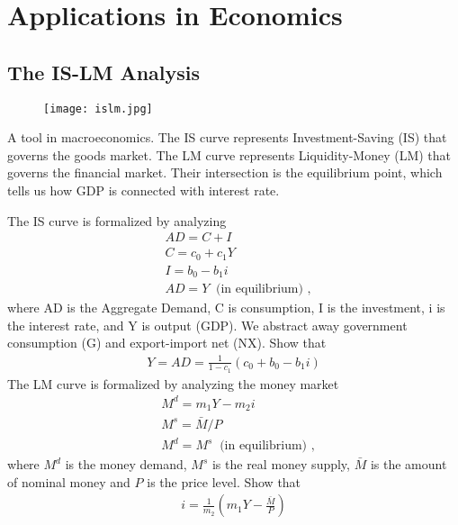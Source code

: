 \documentclass[10pt,a4paper]{book}
\theoremstyle{definition}\newtheorem{definition}{Definition}
\theoremstyle{definition}\newtheorem{fact}{Fact}
\theoremstyle{definition}\newtheorem{ex}{Ex.}
\theoremstyle{definition}\newtheorem{project}{Project}
\theoremstyle{definition}\newtheorem{problem}{Problem}
\theoremstyle{definition}\newtheorem{example}{Example}
\numberwithin{theorem}{chapter}
\numberwithin{corollary}{chapter}
\numberwithin{assumption}{chapter}
\numberwithin{definition}{chapter}
\numberwithin{prop}{chapter}
\numberwithin{notation}{chapter}
\numberwithin{problem}{chapter}
\numberwithin{example}{chapter}
\numberwithin{fact}{chapter}
\numberwithin{ex}{chapter}
\begin{document}
	\chapter{Applications in Economics}
	
	\section{The IS-LM Analysis}
	
	\begin{figure}[ht]
		\centering
		\texttt{[image: islm.jpg]}
	\end{figure}
	
	A tool in macroeconomics. The IS curve represents Investment-Saving (IS) that governs the goods market. The LM curve represents Liquidity-Money (LM) that governs the financial market. Their intersection is the equilibrium point, which tells us how GDP is connected with interest rate.
	
	The IS curve is formalized by analyzing
	\begin{align*}
		& AD = C + I                           \\
		& C = c_0 + c_1 Y                      \\
		& I = b_0 - b_1 i                      \\
		& AD = Y \  \text{ (in equilibrium) }, 
	\end{align*}
	where AD is the Aggregate Demand, C is consumption, I is the investment, i is the interest rate, and Y is output (GDP). We abstract away government consumption (G) and export-import net (NX). Show that
	\begin{align}
		Y = AD = \frac{1}{1-c_1} (c_0 + b_0 - b_1 i) \label{islm:y} 
	\end{align}
	The LM curve is formalized by analyzing the money market
	\begin{align*}
		& M^d = m_1 Y - m_2 i                     \\
		& M^s = \bar{M}/P                         \\
		& M^d = M^s \  \text{ (in equilibrium) }, 
	\end{align*}
	where $M^d$ is the money demand, $M^s$ is the real money supply, $\bar{M}$ is the amount of nominal money and $P$ is the price level. Show that
	\begin{align}
		i = \frac{1}{m_2} (m_1 Y - \frac{\bar{M}}{P}) \label{islm:i} 
	\end{align}
	
\end{document}
